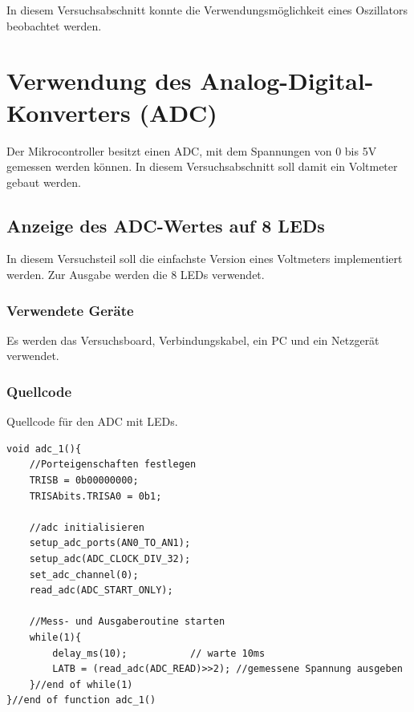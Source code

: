 \documentclass[12pt,a4paper]{article}
\begin{document}
In diesem Versuchsabschnitt konnte die Verwendungsmöglichkeit eines Oszillators beobachtet werden.

\section{Verwendung des Analog-Digital-Konverters (ADC)}

Der Mikrocontroller besitzt einen ADC, mit dem Spannungen von 0 bis 5V gemessen werden können. In diesem Versuchsabschnitt soll damit ein Voltmeter gebaut werden.

\subsection{Anzeige des ADC-Wertes auf 8 LEDs}

In diesem Versuchsteil soll die einfachste Version eines Voltmeters implementiert werden. Zur Ausgabe werden die 8 LEDs verwendet.

\subsubsection*{Verwendete Geräte}

Es werden das Versuchsboard, Verbindungskabel, ein PC und ein Netzgerät verwendet.


\subsubsection*{Quellcode}

Quellcode für den ADC mit LEDs.

\lstset{language=C, basicstyle=\tiny}
\begin{lstlisting}[caption = {adc mit LEDs}, label=lst:g_13,captionpos=b]
void adc_1(){
	//Porteigenschaften festlegen
	TRISB = 0b00000000;
	TRISAbits.TRISA0 = 0b1;
	
	//adc initialisieren
	setup_adc_ports(AN0_TO_AN1);
	setup_adc(ADC_CLOCK_DIV_32);
	set_adc_channel(0);
	read_adc(ADC_START_ONLY);
	
	//Mess- und Ausgaberoutine starten
	while(1){
		delay_ms(10);			// warte 10ms
		LATB = (read_adc(ADC_READ)>>2);	//gemessene Spannung ausgeben
	}//end of while(1)
}//end of function adc_1()
\end{lstlisting}
\end{document}
